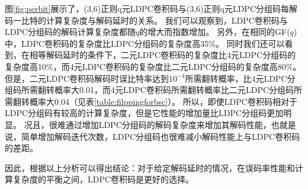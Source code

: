 图\ref{fig:perbit}展示了，(3,6)正则q元LDPC卷积码与(3,6)正则q元LDPC分组码每解码一比特的计算复杂度与解码延时的关系。
我们可以观察到，LDPC卷积码与LDPC分组码的解码计算复杂度都随$q$的增大而指数增加。
另外，在相同的GF($q$)中，LDPC卷积码的复杂度比LDPC分组码的复杂度高35\%。
同时我们还可以看到，在相等解码延时的条件下，二元LDPC卷积码的复杂度比4元LDPC分组码的复杂度高10\%，而4元LDPC卷积码的复杂度比二元LDPC分组码的复杂度高80\%。
但是，二元LDPC卷积码解码时误比特率达到$10^{-4}$所需翻转概率，比4元LDPC分组码所需翻转概率大0.01，而4元LDPC卷积码所需翻转概率比二元LDPC分组码所需翻转概率大0.04（见表\ref{table:filppingforbsc}）。
所以，即使LDPC卷积码相对于LDPC分组码有较高的计算复杂度，但是它性能的增加量比LDPC分组码更加明显。
况且，很难通过增加LDPC分组码的解码复杂度来增加其解码性能，也就是说，简单增加解码迭代次数，LDPC分组码也很难减小解码性能上与LDPC卷积码的差距。

因此，根据以上分析可以得出结论：对于给定解码延时的情况，在误码率性能和计算复杂度的平衡之间，LDPC卷积码是更好的选择。












